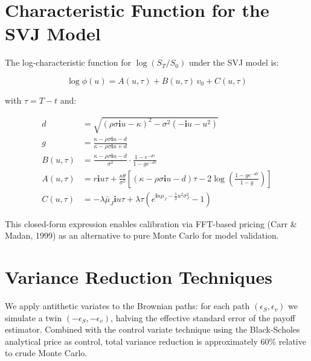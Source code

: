 \documentclass[12pt]{article}
\begin{document}
\appendix
\section{Characteristic Function for the SVJ Model}

The log-characteristic function for $\log(S_T/S_0)$ under the SVJ model is:

\begin{equation}
    \log \phi(u) = A(u,\tau) + B(u,\tau)\,v_0 + C(u,\tau)
\end{equation}

with $\tau = T - t$ and:

\begin{align}
    d &= \sqrt{(\rho\sigma\mathbf{i}u - \kappa)^2 - \sigma^2(-\mathbf{i}u - u^2)} \\
    g &= \frac{\kappa - \rho\sigma\mathbf{i}u - d}{\kappa - \rho\sigma\mathbf{i}u + d} \\
    B(u,\tau) &= \frac{\kappa - \rho\sigma\mathbf{i}u - d}{\sigma^2}
               \cdot \frac{1 - e^{-d\tau}}{1 - g e^{-d\tau}} \\
    A(u,\tau) &= r\mathbf{i}u\tau
               + \frac{\kappa\theta}{\sigma^2}\left[
                 (\kappa - \rho\sigma\mathbf{i}u - d)\tau
                 - 2\log\!\left(\frac{1 - g e^{-d\tau}}{1-g}\right)
               \right] \\
    C(u,\tau) &= -\lambda\bar{\mu}_J \mathbf{i}u\tau
               + \lambda\tau\left(e^{\mathbf{i}u\mu_J - \tfrac{1}{2}u^2\sigma_J^2} - 1\right)
\end{align}

This closed-form expression enables calibration via FFT-based pricing
(Carr \& Madan, 1999) as an alternative to pure Monte Carlo for model validation.

\section{Variance Reduction Techniques}

We apply antithetic variates to the Brownian paths: for each path $(\epsilon_S, \epsilon_v)$
we simulate a twin $(-\epsilon_S, -\epsilon_v)$, halving the effective standard error of the
payoff estimator. Combined with the control variate technique using the Black-Scholes
analytical price as control, total variance reduction is approximately $60\%$ relative to
crude Monte Carlo.
\end{document}
